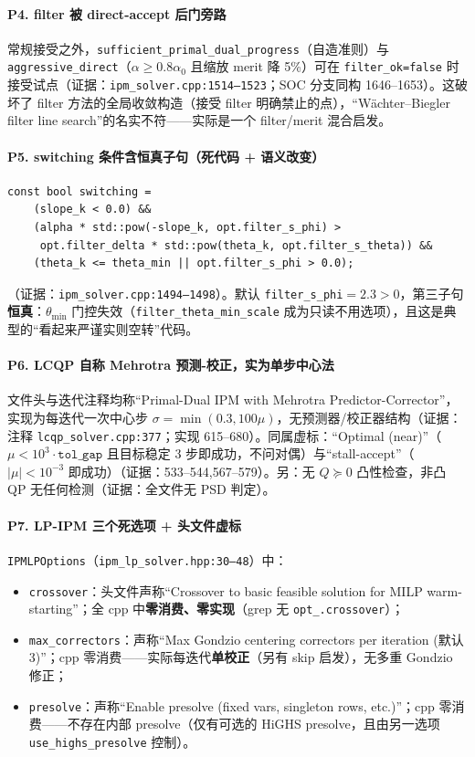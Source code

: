 \documentclass[11pt,a4paper]{ctexart}
\newcommand{\file}[1]{\texttt{#1}}
\newcommand{\func}[1]{\texttt{#1}}
\newcommand{\opt}[1]{\texttt{#1}}
\newcommand{\evid}[1]{{\footnotesize\color{black!70}（证据：#1）}}
\begin{document}
\paragraph{P4. filter 被 direct-accept 后门旁路}
常规接受之外，\func{sufficient\_primal\_dual\_progress}（自造准则）与 \opt{aggressive\_direct}（$\alpha\ge 0.8\alpha_0$ 且缩放 merit 降 5\%）可在 \opt{filter\_ok=false} 时接受试点\evid{\file{ipm\_solver.cpp:1514--1523}；SOC 分支同构 1646--1653}。这破坏了 filter 方法的全局收敛构造（接受 filter 明确禁止的点），``Wächter--Biegler filter line search''的名实不符——实际是一个 filter/merit 混合启发。

\paragraph{P5. switching 条件含恒真子句（死代码 + 语义改变）}
\begin{lstlisting}
const bool switching =
    (slope_k < 0.0) &&
    (alpha * std::pow(-slope_k, opt.filter_s_phi) >
     opt.filter_delta * std::pow(theta_k, opt.filter_s_theta)) &&
    (theta_k <= theta_min || opt.filter_s_phi > 0.0);
\end{lstlisting}
\evid{\file{ipm\_solver.cpp:1494--1498}}。默认 \opt{filter\_s\_phi}${=}2.3>0$，第三子句\textbf{恒真}：$\theta_{\min}$ 门控失效（\opt{filter\_theta\_min\_scale} 成为只读不用选项），且这是典型的``看起来严谨实则空转''代码。

\paragraph{P6. LCQP 自称 Mehrotra 预测-校正，实为单步中心法}
文件头与迭代注释均称``Primal-Dual IPM with Mehrotra Predictor-Corrector''，实现为每迭代一次中心步 $\sigma=\min(0.3,100\mu)$，无预测器/校正器结构\evid{注释 \file{lcqp\_solver.cpp:377}；实现 615--680}。同属虚标：``Optimal (near)''（$\mu<10^3\!\cdot\!\opt{tol\_gap}$ 且目标稳定 3 步即成功，不问对偶）与``stall-accept''（$|\mu|<10^{-3}$ 即成功）\evid{533--544,567--579}。另：无 $Q\succeq 0$ 凸性检查，非凸 QP 无任何检测\evid{全文件无 PSD 判定}。

\paragraph{P7. LP-IPM 三个死选项 + 头文件虚标}
\opt{IPMLPOptions}（\file{ipm\_lp\_solver.hpp:30--48}）中：
\begin{itemize}[leftmargin=2em]
  \item \opt{crossover}：头文件声称``Crossover to basic feasible solution for MILP warm-starting''；全 cpp 中\textbf{零消费、零实现}（grep 无 \opt{opt\_.crossover}）；
  \item \opt{max\_correctors}：声称``Max Gondzio centering correctors per iteration (默认 3)''；cpp 零消费——实际每迭代\textbf{单校正}（另有 skip 启发），无多重 Gondzio 修正；
  \item \opt{presolve}：声称``Enable presolve (fixed vars, singleton rows, etc.)''；cpp 零消费——不存在内部 presolve（仅有可选的 HiGHS presolve，且由另一选项 \opt{use\_highs\_presolve} 控制）。
\end{itemize}
\end{document}
